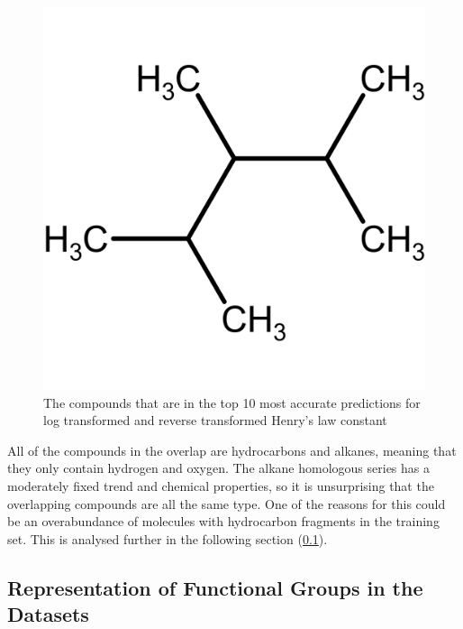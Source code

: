 \documentclass[11pt, titlepage]{article}
\begin{document}
\begin{figure}[H]
\begin{minipage}{0.3\textwidth}
	\end{minipage}
	\begin{minipage}{0.3\textwidth}
		\centering\small
		\includegraphics[width = 0.95\linewidth]{figures/HenryBest3.png}
	\end{minipage}
	\caption{The compounds that are in the top 10 most accurate predictions for log transformed and reverse transformed Henry's law constant}
\end{figure}

All of the compounds in the overlap are hydrocarbons and alkanes, meaning that they only contain hydrogen and oxygen. The alkane homologous series has a moderately fixed trend and chemical properties, so it is unsurprising that the overlapping compounds are all the same type. One of the reasons for this could be an overabundance of molecules with hydrocarbon fragments in the training set. This is analysed further in the following section (\ref{subsec:FuncGroupAnalysis}).

\subsection{Representation of Functional Groups in the Datasets}
\label{subsec:FuncGroupAnalysis}
\end{document}
